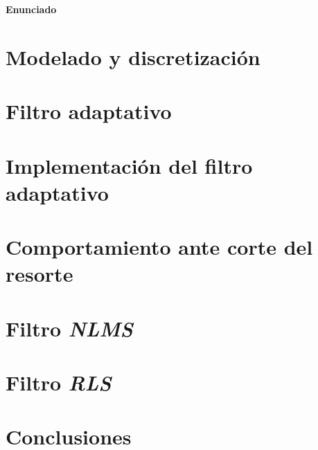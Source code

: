 \documentclass[10pt,a4paper]{article}
\begin{document}
		
	\setcounter{page}{1}

\begin{center}{\Large{\textbf{Enunciado}}}\end{center}
%	

	
	
	\section{Modelado y discretización}\label{sec:ej1}
	
		
	\section{Filtro adaptativo}\label{sec:ej2}
	

	\section{Implementación del filtro adaptativo}\label{sec:ej3}
		


	\pagebreak
	\section{Comportamiento ante corte del resorte}\label{sec:ej4}
		

	\pagebreak
	\section{Filtro \emph{NLMS}}\label{sec:ej5}
		

	\section{Filtro \emph{RLS}}\label{sec:ejRLS}
		

	\section{Conclusiones}\label{sec:conclusiones}
		

\end{document}
